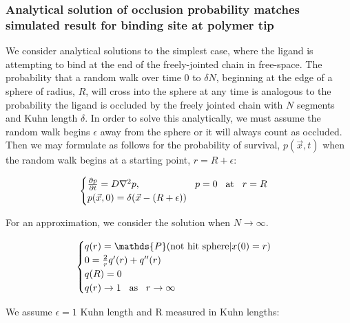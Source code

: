 \documentclass[../../AdvancementSummary.tex]{subfiles}
\begin{document}
\subsubsection{Analytical solution of occlusion probability matches simulated result for binding site at polymer tip}

We consider analytical solutions to the simplest case, where the ligand is attempting to bind at the end of the freely-jointed chain in free-space. The probability that a random walk over time 0 to $\delta N$, beginning at the edge of a sphere of radius, $R$, will cross into the sphere at any time is analogous to the probability the ligand is occluded by the freely jointed chain with $N$ segments and Kuhn length $\delta$. In order to solve this analytically, we must assume the random walk begins $\epsilon$ away from the sphere or it will always count as occluded. Then we may formulate as follows for the probability of survival, $p(\vec{x},t)$ when the random walk begins at a starting point, $r=R+\epsilon$:

\begin{equation}\label{eq: diffusion}
	\begin{cases}
		\frac{\partial p}{\partial t} = D \nabla^2 p, \hspace{2cm} p=0 \hspace{3mm}\text{at}\hspace{3mm} r=R\\
		p(\vec{x},0) = \delta(\vec{x}-(R+\epsilon))\\
	\end{cases}
\end{equation}

For an approximation, we consider the solution when $N\rightarrow \infty$.

 \begin{equation}\label{eq: analytic}
  	\begin{cases}
 	q(r)=\mathds{P}(\text{not hit sphere}|x(0)=r) \\
 	0=\frac{2}{r}q'(r)+q''(r) \\
 	q(R) = 0 \\
 	q(r) \rightarrow 1 \hspace{3mm}\text{as}\hspace{3mm} r \rightarrow \infty \\
 	\end{cases}
 \end{equation}

 We assume $\epsilon = 1$ Kuhn length and R measured in Kuhn lengths:
\end{document}
